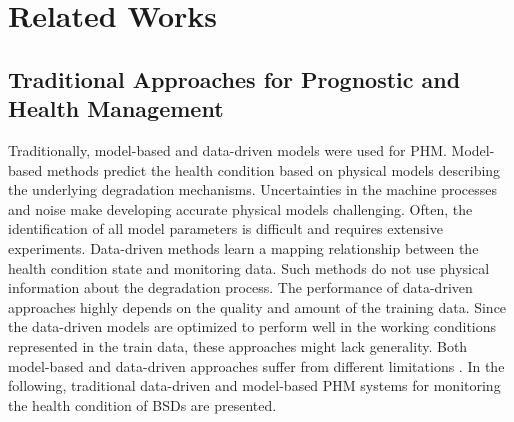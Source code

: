 
\chapter{Related Works}\label{chapter:related_works}


\section{Traditional Approaches for Prognostic and Health Management}\label{sec:traditional_approaches}

Traditionally, model-based and data-driven models were used for PHM. Model-based methods predict the health condition based on physical models describing the underlying degradation mechanisms. Uncertainties in the machine processes and noise make developing accurate physical models challenging. Often, the identification of all model parameters is difficult and requires extensive experiments. Data-driven methods learn a mapping relationship between the health condition state and monitoring data. Such methods do not use physical information about the degradation process. The performance of data-driven approaches highly depends on the quality and amount of the training data. Since the data-driven models are optimized to perform well in the working conditions represented in the train data, these approaches might lack generality. Both model-based and data-driven approaches suffer from different limitations \cite{DENG2020}. In the following, traditional data-driven and model-based PHM systems for monitoring the health condition of BSDs are presented.


